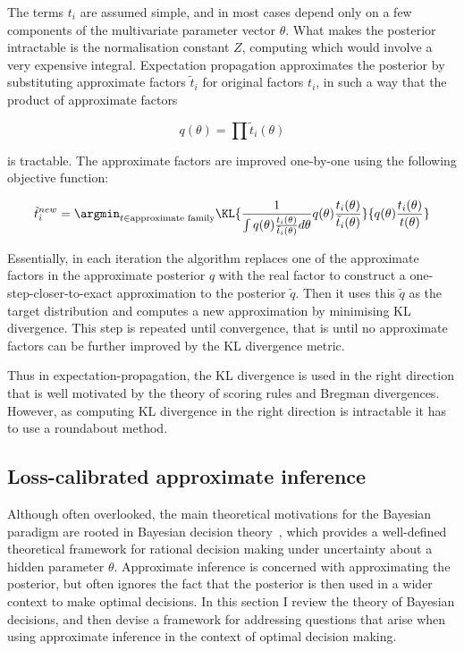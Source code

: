 The terms $t_i$ are assumed simple, and in most cases depend only on a few components of the multivariate parameter vector $\theta$. What makes the posterior intractable is the normalisation constant $Z$, computing which would involve a very expensive integral. Expectation propagation approximates the posterior by substituting approximate factors $\tilde{t}_i$ for original factors $t_i$, in such a way that the product of approximate factors

\begin{equation}
	q(\theta) = \prod \tilde{t}_i(\theta)
\end{equation}

is tractable. The approximate factors are improved one-by-one using the following objective function:

\begin{equation}
	\tilde{t}_i^{new} = \argmin_{t \in \text{approximate family}} \KL{\frac{1}{\int q(\theta)\frac{t_i(\theta)}{\tilde{t}_i(\theta)} d\theta}q(\theta)\frac{t_i(\theta)}{\tilde{t}_i(\theta)}}{q(\theta)\frac{t_i(\theta)}{t(\theta)}}
\end{equation}

Essentially, in each iteration the algorithm replaces one of the approximate factors in the approximate posterior $q$ with the real factor to construct a one-step-closer-to-exact approximation to the posterior $\tilde{q}$. Then it uses this $\tilde{q}$ as the target distribution and computes a new approximation by minimising KL divergence. This step is repeated until convergence, that is until no approximate factors can be further improved by the KL divergence metric.

Thus in expectation-propagation, the KL divergence is used in the right direction that is well motivated by the theory of scoring rules and Bregman divergences. However, as computing KL divergence in the right direction is intractable it has to use a roundabout method.

\subsection{Loss-calibrated approximate inference}

Although often overlooked, the main theoretical motivations for the Bayesian paradigm are rooted in Bayesian decision theory~\citep{berger85decision}, which provides a well-defined theoretical framework for rational decision making under uncertainty about a hidden parameter $\theta$. Approximate inference is concerned with approximating the posterior, but often ignores the fact that the posterior is then used in a wider context to make optimal decisions. In this section I review the theory of Bayesian decisions, and then devise a framework for addressing questions that arise when using approximate inference in the context of optimal decision making.

